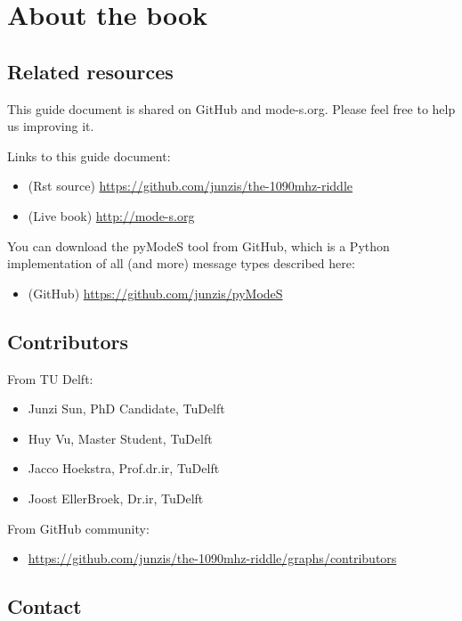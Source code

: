 \chapter{About the book}

\section{Related resources}\label{related-resources}

This guide document is shared on GitHub and mode-s.org. Please feel free
to help us improving it.

Links to this guide document:

\begin{itemize}
\item
  (Rst source) \url{https://github.com/junzis/the-1090mhz-riddle}
\item
  (Live book) \url{http://mode-s.org}
\end{itemize}

You can download the pyModeS tool from GitHub, which is a Python
implementation of all (and more) message types described here:

\begin{itemize}
\item
  (GitHub) \url{https://github.com/junzis/pyModeS}
\end{itemize}

\section{Contributors}\label{contributors}

From TU Delft:

\begin{itemize}
\item
  Junzi Sun, PhD Candidate, TuDelft
\item
  Huy Vu, Master Student, TuDelft
\item
  Jacco Hoekstra, Prof.dr.ir, TuDelft
\item
  Joost EllerBroek, Dr.ir, TuDelft
\end{itemize}

From GitHub community:

\begin{itemize}
\item
  \url{https://github.com/junzis/the-1090mhz-riddle/graphs/contributors}
\end{itemize}

\section{Contact}\label{contact}

